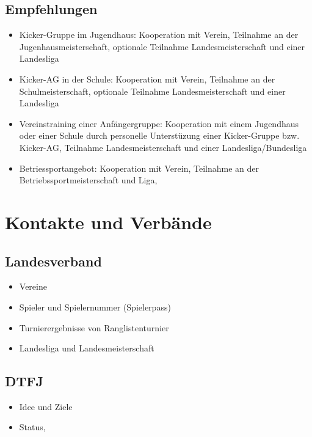 \subsection{Empfehlungen}
\begin{itemize}
\item Kicker-Gruppe im Jugendhaus: 
Kooperation mit Verein,
Teilnahme an der Jugenhausmeisterschaft,  
optionale Teilnahme Landesmeisterschaft und einer Landesliga
\item Kicker-AG in der Schule: 
Kooperation mit Verein, 
Teilnahme an der Schulmeisterschaft, 
optionale Teilnahme Landesmeisterschaft und einer Landesliga
\item Vereinstraining einer Anfängergruppe: 
Kooperation mit einem Jugendhaus oder einer Schule durch personelle Unterstüzung einer Kicker-Gruppe bzw. Kicker-AG, 
Teilnahme Landesmeisterschaft und einer Landesliga/Bundesliga
\item Betriessportangebot: 
Kooperation mit Verein, 
Teilnahme an der Betriebssportmeisterschaft und Liga,
\end{itemize}


\section{Kontakte und Verbände}

\subsection{Landesverband}

\begin{itemize}
\item Vereine
\item Spieler und Spielernummer (Spielerpass)
\item Turnierergebnisse von Ranglistenturnier 
\item Landesliga und Landesmeisterschaft
\end{itemize}

\subsection{DTFJ}

\begin{itemize}
\item Idee und Ziele
\item Status, \cite{ehring2010}
\end{itemize}

